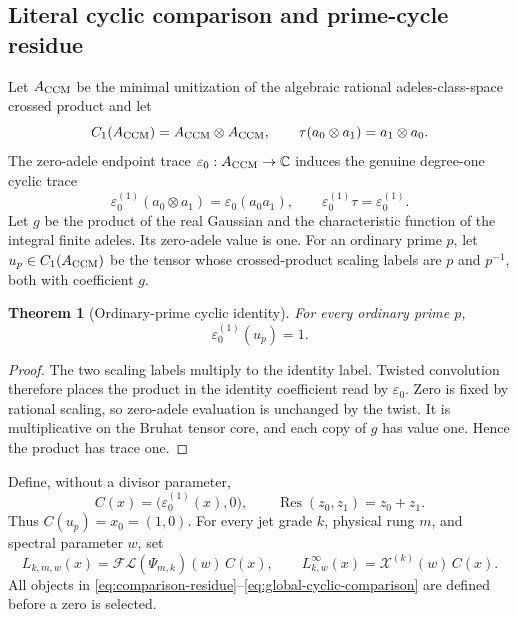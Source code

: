 \documentclass[11pt]{article}
\newtheorem{theorem}{Theorem}[section]
\theoremstyle{definition}
\theoremstyle{remark}
\newcommand{\C}{\mathbb C}
\newcommand{\XiC}{\mathcal X}
\begin{document}
\subsection{Literal cyclic comparison and prime-cycle residue}

Let \(A_{\rm CCM}\) be the minimal unitization of the algebraic rational
adeles-class-space crossed product and let
\[
 C_1(A_{\rm CCM})=A_{\rm CCM}\otimes A_{\rm CCM},
 \qquad \tau(a_0\otimes a_1)=a_1\otimes a_0.
\]
The zero-adele endpoint trace \(\varepsilon_0:A_{\rm CCM}\to\C\) induces
the genuine degree-one cyclic trace
\[
 \varepsilon_0^{(1)}(a_0\otimes a_1)=\varepsilon_0(a_0a_1),
 \qquad \varepsilon_0^{(1)}\tau=\varepsilon_0^{(1)}.
\tag{8.1}\label{eq:cyclic-trace}
\]
Let \(g\) be the product of the real Gaussian and the characteristic
function of the integral finite adeles.  Its zero-adele value is one.  For
an ordinary prime \(p\), let \(u_p\in C_1(A_{\rm CCM})\) be the tensor whose
crossed-product scaling labels are \(p\) and \(p^{-1}\), both with
coefficient \(g\).

\begin{theorem}[Ordinary-prime cyclic identity]
\label{thm:prime-cycle}
For every ordinary prime \(p\),
\[
                         \varepsilon_0^{(1)}(u_p)=1.
\tag{8.2}\label{eq:prime-cycle-one}
\]
\end{theorem}

\begin{proof}
The two scaling labels multiply to the identity label.  Twisted convolution
therefore places the product in the identity coefficient read by
\(\varepsilon_0\).  Zero is fixed by rational scaling, so zero-adele
evaluation is unchanged by the twist.  It is multiplicative on the Bruhat
tensor core, and each copy of \(g\) has value one.  Hence the product has
trace one.
\end{proof}

Define, without a divisor parameter,
\[
 C(x)=\bigl(\varepsilon_0^{(1)}(x),0\bigr),
 \qquad
 \operatorname{Res}(z_0,z_1)=z_0+z_1.
\tag{8.3}\label{eq:comparison-residue}
\]
Thus \(C(u_p)=x_0=(1,0)\).  For every jet grade \(k\), physical rung \(m\),
and spectral parameter \(w\), set
\[
 L_{k,m,w}(x)=
   \mathcal{FL}(\Psi_{m,k})(w)\,C(x),
 \qquad
 L_{k,w}^{\infty}(x)=\XiC^{(k)}(w)\,C(x).
\tag{8.4}\label{eq:global-cyclic-comparison}
\]
All objects in \eqref{eq:comparison-residue}--\eqref{eq:global-cyclic-comparison}
are defined before a zero is selected.
\end{document}
